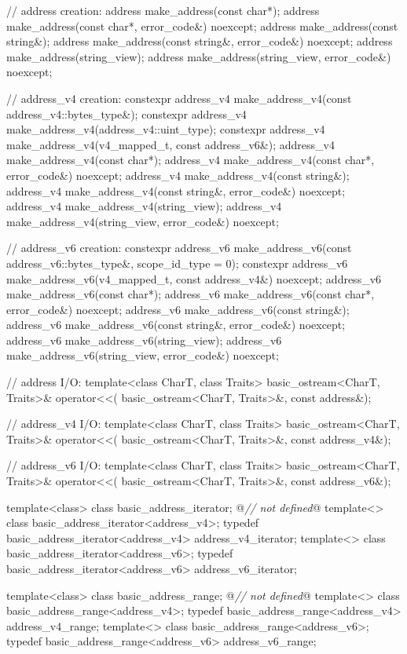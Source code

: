 \begin{codeblock}
{{{{{  // address creation:
  address make_address(const char*);
  address make_address(const char*, error_code&) noexcept;
  address make_address(const string&);
  address make_address(const string&, error_code&) noexcept;
  address make_address(string_view);
  address make_address(string_view, error_code&) noexcept;

  // address_v4 creation:
  constexpr address_v4 make_address_v4(const address_v4::bytes_type&);
  constexpr address_v4 make_address_v4(address_v4::uint_type);
  constexpr address_v4 make_address_v4(v4_mapped_t, const address_v6&);
  address_v4 make_address_v4(const char*);
  address_v4 make_address_v4(const char*, error_code&) noexcept;
  address_v4 make_address_v4(const string&);
  address_v4 make_address_v4(const string&, error_code&) noexcept;
  address_v4 make_address_v4(string_view);
  address_v4 make_address_v4(string_view, error_code&) noexcept;

  // address_v6 creation:
  constexpr address_v6 make_address_v6(const address_v6::bytes_type&,
                                       scope_id_type = 0);
  constexpr address_v6 make_address_v6(v4_mapped_t, const address_v4&) noexcept;
  address_v6 make_address_v6(const char*);
  address_v6 make_address_v6(const char*, error_code&) noexcept;
  address_v6 make_address_v6(const string&);
  address_v6 make_address_v6(const string&, error_code&) noexcept;
  address_v6 make_address_v6(string_view);
  address_v6 make_address_v6(string_view, error_code&) noexcept;

  // address I/O:
  template<class CharT, class Traits>
    basic_ostream<CharT, Traits>& operator<<(
      basic_ostream<CharT, Traits>&, const address&);

  // address_v4 I/O:
  template<class CharT, class Traits>
    basic_ostream<CharT, Traits>& operator<<(
      basic_ostream<CharT, Traits>&, const address_v4&);

  // address_v6 I/O:
  template<class CharT, class Traits>
    basic_ostream<CharT, Traits>& operator<<(
      basic_ostream<CharT, Traits>&, const address_v6&);

  template<class> class basic_address_iterator; @\textit{// not defined}@
  template<> class basic_address_iterator<address_v4>;
  typedef basic_address_iterator<address_v4> address_v4_iterator;
  template<> class basic_address_iterator<address_v6>;
  typedef basic_address_iterator<address_v6> address_v6_iterator;

  template<class> class basic_address_range; @\textit{// not defined}@
  template<> class basic_address_range<address_v4>;
  typedef basic_address_range<address_v4> address_v4_range;
  template<> class basic_address_range<address_v6>;
  typedef basic_address_range<address_v6> address_v6_range;

}}}}}
\end{codeblock}
